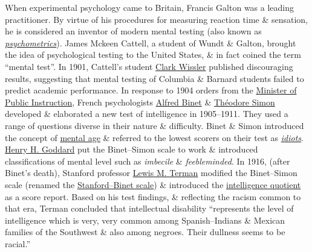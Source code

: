\documentclass[oneside]{book}
\numberwithin{equation}{section}
\begin{document}
When experimental psychology came to Britain, Francis Galton was a leading practitioner. By virtue of his procedures for measuring reaction time \& sensation, he is considered an inventor of modern mental testing (also known as \href{https://en.wikipedia.org/wiki/Psychometrics}{\textit{psychometrics}}). James Mckeen Cattell, a student of Wundt \& Galton, brought the idea of psychological testing to the United States, \& in fact coined the term ``mental test''. In 1901, Cattell's student \href{https://en.wikipedia.org/wiki/Clark_Wissler}{Clark Wissler} published discouraging results, suggesting that mental testing of Columbia \& Barnard students failed to predict academic performance. In response to 1904 orders from the \href{https://en.wikipedia.org/wiki/Ministry_of_National_Education_(France)}{Minister of Public Instruction}, French psychologists \href{https://en.wikipedia.org/wiki/Alfred_Binet}{Alfred Binet} \& \href{https://en.wikipedia.org/wiki/Th%C3%A9odore_Simon}{Th\'eodore Simon} developed \& elaborated a new test of intelligence in 1905--1911. They used a range of questions diverse in their nature \& difficulty. Binet \& Simon introduced the concept of \href{https://en.wikipedia.org/wiki/Mental_age}{mental age} \& referred to the lowest scorers on their test as \href{https://en.wikipedia.org/wiki/Idiot}{\textit{idiots}}. \href{https://en.wikipedia.org/wiki/Henry_H._Goddard}{Henry H. Goddard} put the Binet--Simon scale to work \& introduced classifications of mental level such as \textit{imbecile} \& \textit{feebleminded}. In 1916, (after Binet's death), Stanford professor \href{https://en.wikipedia.org/wiki/Lewis_M._Terman}{Lewis M. Terman} modified the Binet--Simon scale (renamed the \href{https://en.wikipedia.org/wiki/Stanford%E2%80%93Binet_Intelligence_Scales}{Stanford--Binet scale}) \& introduced the \href{https://en.wikipedia.org/wiki/Intelligence_quotient}{intelligence quotient} as a score report. Based on his test findings, \& reflecting the racism common to that era, Terman concluded that intellectual disability ``represents the level of intelligence which is very, very common among Spanish--Indians \& Mexican families of the Southwest \& also among negroes. Their dullness seems to be racial.''
\end{document}
